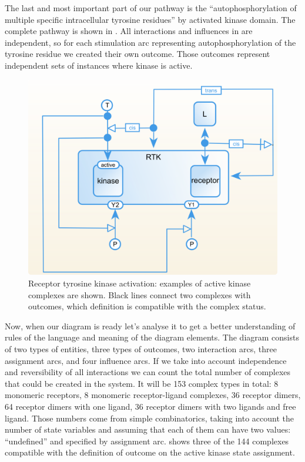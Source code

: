The last and most important part of our pathway is the ``autophosphorylation of multiple specific intracellular tyrosine residues'' by activated kinase domain. The complete pathway is shown in . All interactions and influences in \SBGNERLone are independent, so for each stimulation arc representing autophosphorylation of the tyrosine residue we created their own outcome. Those outcomes represent independent sets of instances where kinase is active.

\begin{figure}[H]
  \centering
  \vspace*{-0.75em}
  \includegraphics[scale=0.75]{examples/rtk.png}
   \caption{Receptor tyrosine kinase activation: examples of active kinase complexes are shown. Black lines connect two complexes with outcomes, which definition is compatible with the complex status.}
  \label{fig:rtk-full}
\end{figure}

Now, when our diagram is ready let's analyse it to get a better understanding of rules of the language and meaning of the diagram elements. The diagram consists of two types of entities, three types of outcomes, two interaction arcs, three assignment arcs, and four influence arcs. If we take into account independence and reversibility of all interactions we can count the total number of complexes that could be created in the system. It will be 153 complex types in total: 8 monomeric receptors, 8 monomeric receptor-ligand complexes, 36 receptor dimers, 64 receptor dimers with one ligand, 36 receptor dimers with two ligands and free ligand. Those numbers come from simple combinatorics, taking into account the number of state variables and assuming that each of them can have two values: ``undefined'' and specified by assignment arc.  shows three of the 144 complexes compatible with the definition of outcome on the active kinase state assignment.

